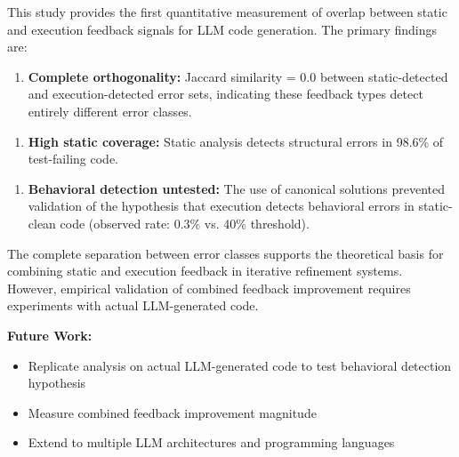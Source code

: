 
This study provides the first quantitative measurement of overlap between static and execution feedback signals for LLM code generation. The primary findings are:

\begin{enumerate}
\item \textbf{Complete orthogonality:} Jaccard similarity = 0.0 between static-detected and execution-detected error sets, indicating these feedback types detect entirely different error classes.
\end{enumerate}

\begin{enumerate}
\item \textbf{High static coverage:} Static analysis detects structural errors in 98.6\% of test-failing code.
\end{enumerate}

\begin{enumerate}
\item \textbf{Behavioral detection untested:} The use of canonical solutions prevented validation of the hypothesis that execution detects behavioral errors in static-clean code (observed rate: 0.3\% vs. 40\% threshold).
\end{enumerate}

The complete separation between error classes supports the theoretical basis for combining static and execution feedback in iterative refinement systems. However, empirical validation of combined feedback improvement requires experiments with actual LLM-generated code.

\textbf{Future Work:}
\begin{itemize}
\item Replicate analysis on actual LLM-generated code to test behavioral detection hypothesis
\item Measure combined feedback improvement magnitude
\item Extend to multiple LLM architectures and programming languages
\end{itemize}

